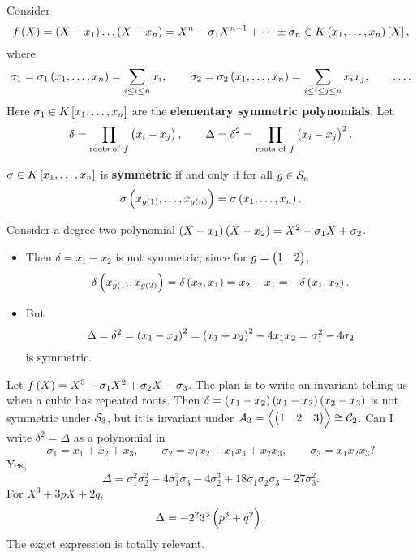 
Consider
$$ f\br{X} = \br{X - x_1} \dots \br{X - x_n} = X^n - \sigma_1X^{n - 1} + \dots \pm \sigma_n \in K\br{x_1, \dots, x_n}\sbr{X}, $$
where
$$ \sigma_1 = \sigma_1\br{x_1, \dots, x_n} = \sum_{i \le i \le n} x_i, \qquad \sigma_2 = \sigma_2\br{x_1, \dots, x_n} = \sum_{i \le i \le j \le n} x_ix_j, \qquad \dots. $$
Here $ \sigma_1 \in K\sbr{x_1, \dots, x_n} $ are the \textbf{elementary symmetric polynomials}. Let
$$ \delta = \prod_{\text{roots of} \ f} \br{x_i - x_j}, \qquad \Delta = \delta^2 = \prod_{\text{roots of} \ f} \br{x_i - x_j}^2. $$

\pagebreak

\begin{definition}
$ \sigma \in K\sbr{x_1, \dots, x_n} $ is \textbf{symmetric} if and only if for all $ g \in \mathcal{S}_n $
$$ \sigma\br{x_{g\br{1}}, \dots, x_{g\br{n}}} = \sigma\br{x_1, \dots, x_n}. $$
\end{definition}

\begin{example*}
Consider a degree two polynomial $ \br{X - x_1}\br{X - x_2} = X^2 - \sigma_1X + \sigma_2 $.
\begin{itemize}
\item Then $ \delta = x_1 - x_2 $ is not symmetric, since for $ g = \begin{pmatrix} 1 & 2 \end{pmatrix} $,
$$ \delta\br{x_{g\br{1}}, x_{g\br{2}}} = \delta\br{x_2, x_1} = x_2 - x_1 = -\delta\br{x_1, x_2}. $$
\item But
$$ \Delta = \delta^2 = \br{x_1 - x_2}^2 = \br{x_1 + x_2}^2 - 4x_1x_2 = \sigma_1^2 - 4\sigma_2 $$
is symmetric.
\end{itemize}
\end{example*}

\begin{example*}
Let $ f\br{X} = X^3 - \sigma_1X^2 + \sigma_2X - \sigma_3 $. The plan is to write an invariant telling us when a cubic has repeated roots. Then $ \delta = \br{x_1 - x_2}\br{x_1 - x_3}\br{x_2 - x_3} $ is not symmetric under $ \mathcal{S}_3 $, but it is invariant under $ \mathcal{A}_3 = \left\langle \begin{pmatrix} 1 & 2 & 3 \end{pmatrix} \right\rangle \cong \mathcal{C}_2 $. Can I write $ \delta^2 = \Delta $ as a polynomial in
$$ \sigma_1 = x_1 + x_2 + x_3, \qquad \sigma_2 = x_1x_2 + x_1x_3 + x_2x_3, \qquad \sigma_3 = x_1x_2x_3? $$
Yes,
$$ \Delta = \sigma_1^2\sigma_2^2 - 4\sigma_1^3\sigma_3 - 4\sigma_2^3 + 18\sigma_1\sigma_2\sigma_3 - 27\sigma_3^2. $$
For $ X^3 + 3pX + 2q $,
$$ \Delta = -2^23^3\br{p^3 + q^2}. $$
The exact expression is totally relevant.
\end{example*}

